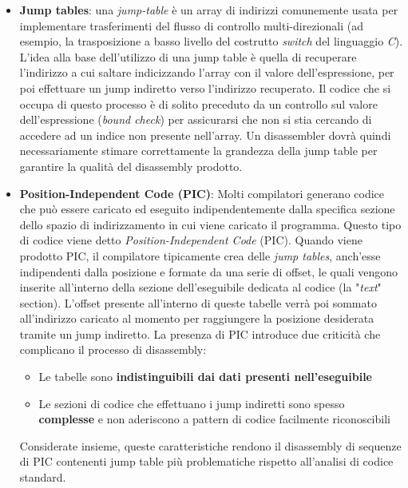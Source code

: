 \documentclass[../main.tex]{subfiles}
\begin{document}
\begin{itemize}
    \item \textbf{Jump tables}: una \textit{jump-table} è un array di indirizzi comunemente usata per implementare trasferimenti del flusso di controllo multi-direzionali (ad esempio, la trasposizione a basso livello del costrutto \textit{switch} del linguaggio \textit{C}).
    L'idea alla base dell'utilizzo di una jump table è quella di recuperare l'indirizzo a cui saltare indicizzando l'array con il valore dell'espressione, per poi effettuare un jump indiretto verso l'indirizzo recuperato.
    Il codice che si occupa di questo processo è di solito preceduto da un controllo sul valore dell'espressione (\textit{bound check}) per assicurarsi che non si stia cercando di accedere ad un indice non presente nell'array.
    Un disassembler dovrà quindi necessariamente stimare correttamente la grandezza della jump table per garantire la qualità del disassembly prodotto.
    \item \textbf{Position-Independent Code (PIC)}: Molti compilatori generano codice che può essere caricato ed eseguito indipendentemente dalla specifica sezione dello spazio di indirizzamento in cui viene caricato il programma.
    Questo tipo di codice viene detto \textit{Position-Independent Code} (PIC). Quando viene prodotto PIC, il compilatore tipicamente crea delle \textit{jump tables}, anch'esse indipendenti dalla posizione e formate da una serie di offset, le quali vengono inserite all'interno della sezione dell'eseguibile dedicata al codice (la "\textit{text}" section).
    L'offset presente all'interno di queste tabelle verrà poi sommato all'indirizzo caricato al momento per raggiungere la posizione desiderata tramite un jump indiretto.
    La presenza di PIC introduce due criticità che complicano il processo di disassembly:
    \begin{itemize}
        \item Le tabelle sono \textbf{indistinguibili dai dati presenti nell'eseguibile}
        \item Le sezioni di codice che effettuano i jump indiretti sono spesso \textbf{complesse} e non aderiscono a pattern di codice facilmente riconoscibili
    \end{itemize}
    Considerate insieme, queste caratteristiche rendono il disassembly di sequenze di PIC contenenti jump table più problematiche rispetto all'analisi di codice standard.
\end{itemize}
\end{document}
